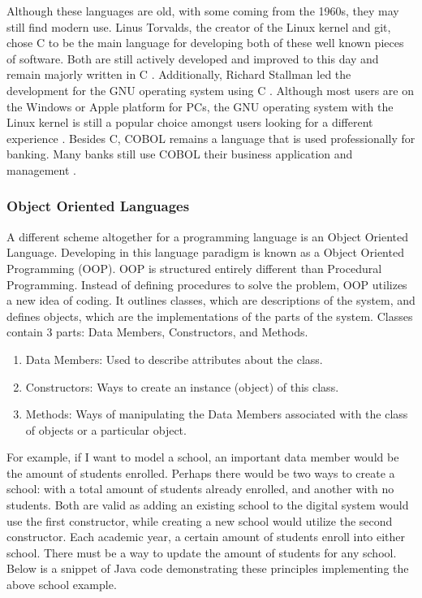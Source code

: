 Although these languages are old, with some coming from the 1960s, they may still find modern use.
Linus Torvalds, the creator of the Linux kernel and git, chose C to be the main language for developing both of these well known pieces of software.
Both are still actively developed and improved to this day and remain majorly written in C \cite{GitMadeinC,LinuxMadeinC}.
Additionally, Richard Stallman led the development for the GNU operating system using C \cite{GNUPreferC}.
Although most users are on the Windows or Apple platform for PCs, the GNU operating system with the Linux kernel is still a popular choice amongst users looking for a different experience \cite{MarketShareOS}.
Besides C, COBOL remains a language that is used professionally for banking.
Many banks still use COBOL their business application and management \cite{COBOLBanks}.

\subsubsection{Object Oriented Languages}\label{subsubsec:OOPL}

A different scheme altogether for a programming language is an Object Oriented Language.
Developing in this language paradigm is known as a Object Oriented Programming (OOP).
OOP is structured entirely different than Procedural Programming.
Instead of defining procedures to solve the problem, OOP utilizes a new idea of coding.
It outlines classes, which are descriptions of the system, and defines objects, which are the implementations of the parts of the system.
Classes contain 3 parts: Data Members, Constructors, and Methods.

\begin{enumerate}
    \item Data Members: Used to describe attributes about the class.
    \item Constructors: Ways to create an instance (object) of this class.
    \item Methods: Ways of manipulating the Data Members associated with the class of objects or a particular object.
\end{enumerate}

For example, if I want to model a school, an important data member would be the amount of students enrolled.
Perhaps there would be two ways to create a school: with a total amount of students already enrolled, and another with no students.
Both are valid as adding an existing school to the digital system would use the first constructor, while creating a new school would utilize the second constructor.
Each academic year, a certain amount of students enroll into either school.
There must be a way to update the amount of students for any school.
Below is a snippet of Java code demonstrating these principles implementing the above school example.

